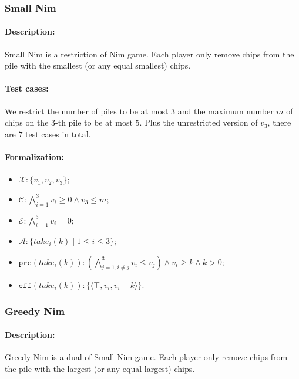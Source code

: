 \documentclass[review]{elsarticle}
\newcommand{\set}[1]{\{ #1 \}}
\newcommand{\tuple}[1]{\langle {#1} \rangle}
\newcommand{\true}{\top}
\newcommand{\statevar}{\mathcal{X}}
\newcommand{\act}{\mathcal{A}}
\newcommand{\constraint}{\mathcal{C}}
\newcommand{\estate}{\mathcal{E}}
\newcommand{\pre}{\mathtt{pre}}
\newcommand{\eff}{\mathtt{eff}}
\begin{document}
\subsubsection{Small Nim \protect\cite{BerCG2001}}

\paragraph{Description:} 
Small Nim is a restriction of Nim game.
Each player only remove chips from the pile with the smallest (or any equal smallest) chips.

\paragraph{Test cases:}
We restrict the number of piles to be at most $3$ and the maximum number $m$ of chips on the $3$-th pile to be at most $5$. 
Plus the unrestricted version of $v_3$, there are $7$ test cases in total.

\paragraph{Formalization:}

\begin{itemize}
	\item $\statevar: \set{v_1, v_2, v_3}$;
	\item $\constraint:\bigwedge_{i=1}^{3} v_i \ge 0 \wedge v_3 \le m$;
	\item $\estate: \bigwedge_{i=1}^{3} v_i = 0$;
	\item $\act:\set{take_i(k) {\mid}1\le i \le 3}$;
	\item $\pre(take_i(k)) : (\bigwedge_{j=1,i\neq j}^{3} v_i \le v_j) \wedge v_i \ge k \wedge  k > 0$;
	\item $\eff(take_i(k)) : \set{\tuple{\true, v_i, v_i-k}}$.
\end{itemize}



\subsubsection{Greedy Nim \protect\cite{AlbN2004}}

\paragraph{Description:}
Greedy Nim is a dual of Small Nim game.
Each player only remove chips from the pile with the largest (or any equal largest) chips.
\end{document}
